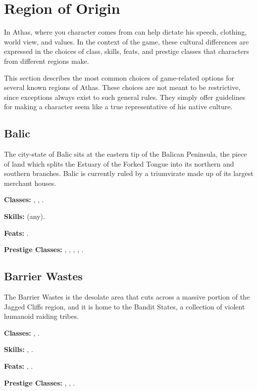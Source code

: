 \section{Region of Origin}

In Athas, where you character comes from can help dictate his speech, clothing, world view, and values. In the context of the game, these cultural differences are expressed in the choices of class, skills, feats, and prestige classes that characters from different regions make.

This section describes the most common choices of game-related options for several known regions of Athas. These choices are not meant to be restrictive, since exceptions always exist to such general rules. They simply offer guidelines for making a character seem like a true representative of his native culture.

\subsection{Balic}
The city-state of Balic sits at the eastern tip of the Balican Peninsula, the piece of land which splits the Estuary of the Forked Tongue into its northern and southern branches. Balic is currently ruled by a triumvirate made up of its largest merchant houses.

\textbf{Classes:} , , .

\textbf{Skills:}  (any).

\textbf{Feats:} .

\textbf{Prestige Classes:} , , , , .

\subsection{Barrier Wastes}
The Barrier Wastes is the desolate area that cuts across a massive portion of the Jagged Cliffs region, and it is home to the Bandit States, a collection of violent humanoid raiding tribes.

\textbf{Classes:} , .

\textbf{Skills:} , .

\textbf{Feats:} , .

\textbf{Prestige Classes:} , , .

